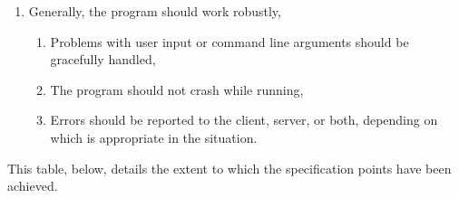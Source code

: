 \documentclass[../main.tex]{subfiles}
\begin{document}
\begin{enumerate}
\begin{enumerate}
        \item This checking should be with a much smaller version of the file than that which was originally sent for most files – it should be up to 10kB in size, 
    \end{enumerate}
    \item Generally, the program should work robustly,
        \begin{enumerate}
            \item Problems with user input or command line arguments should be gracefully handled,
            \item The program should not crash while running,
            \item Errors should be reported to the client, server, or both, depending on which is appropriate in the situation.
        \end{enumerate}
\end{enumerate}

This table, below, details the extent to which the specification points have been achieved.
\end{document}
